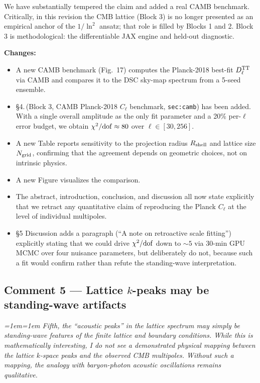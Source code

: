 \documentclass[12pt,a4paper]{article}
\newenvironment{review}{\par\color{revcolor}\itshape\leftskip=1em\rightskip=1em\noindent}{\par}
\begin{document}
We have substantially tempered the claim and added a real CAMB benchmark.
Critically, in this revision the CMB lattice (Block 3) is no longer presented as an empirical anchor of the $1/\ln^2$ ansatz; that role is filled by Blocks 1 and 2.
Block 3 is methodological: the differentiable JAX engine and held-out diagnostic.

\textbf{Changes:}
\begin{itemize}[leftmargin=2em]
  \item A new CAMB benchmark (Fig.~17) computes the Planck-2018 best-fit $D_\ell^{\rm TT}$ via CAMB and compares it to the DSC sky-map spectrum from a 5-seed ensemble.
  \item §4.\,(Block 3, CAMB Planck-2018 $C_\ell$ benchmark, \texttt{sec:camb}) has been added.
    With a single overall amplitude as the only fit parameter and a 20\% per-$\ell$ error budget, we obtain $\chi^2/{\rm dof} \approx 80$ over $\ell \in [30, 256]$.
  \item A new Table reports sensitivity to the projection radius $R_{\rm shell}$ and lattice size $N_{\rm grid}$, confirming that the agreement depends on geometric choices, not on intrinsic physics.
  \item A new Figure visualizes the comparison.
  \item The abstract, introduction, conclusion, and discussion all now state explicitly that we retract any quantitative claim of reproducing the Planck $C_\ell$ at the level of individual multipoles.
  \item §5 Discussion adds a paragraph (``A note on retroactive scale fitting'') explicitly stating that we could drive $\chi^2/{\rm dof}$ down to $\sim 5$ via 30-min GPU MCMC over four nuisance parameters, but deliberately do not, because such a fit would confirm rather than refute the standing-wave interpretation.
\end{itemize}

\subsection*{Comment 5 --- Lattice $k$-peaks may be standing-wave artifacts}

\begin{review}
\textit{Fifth, the ``acoustic peaks'' in the lattice spectrum may simply be standing-wave features of the finite lattice and boundary conditions. While this is mathematically interesting, I do not see a demonstrated physical mapping between the lattice $k$-space peaks and the observed CMB multipoles. Without such a mapping, the analogy with baryon-photon acoustic oscillations remains qualitative.}
\end{review}
\end{document}
